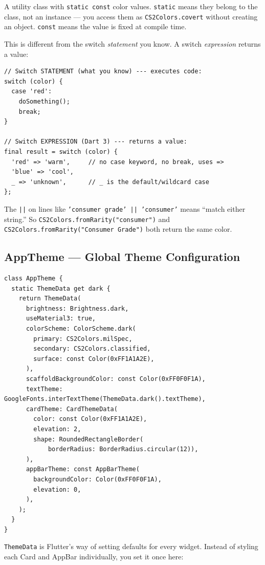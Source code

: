\documentclass[11pt, a4paper]{article}
\begin{document}
A utility class with \texttt{static const} color values. \texttt{static} means they belong to the class, not an instance --- you access them as \texttt{CS2Colors.covert} without creating an object. \texttt{const} means the value is fixed at compile time.

\begin{conceptbox}[title=\textbf{Switch Expression (Dart 3)}]
This is different from the switch \emph{statement} you know. A switch \emph{expression} returns a value:

\begin{lstlisting}[numbers=none]
// Switch STATEMENT (what you know) --- executes code:
switch (color) {
  case 'red':
    doSomething();
    break;
}

// Switch EXPRESSION (Dart 3) --- returns a value:
final result = switch (color) {
  'red' => 'warm',     // no case keyword, no break, uses =>
  'blue' => 'cool',
  _ => 'unknown',      // _ is the default/wildcard case
};
\end{lstlisting}

The \texttt{||} on lines like \texttt{'consumer grade' || 'consumer'} means ``match either string.'' So \texttt{CS2Colors.fromRarity("consumer")} and \texttt{CS2Colors.fromRarity("Consumer Grade")} both return the same color.
\end{conceptbox}

\subsection{AppTheme --- Global Theme Configuration}

\begin{lstlisting}
class AppTheme {
  static ThemeData get dark {
    return ThemeData(
      brightness: Brightness.dark,
      useMaterial3: true,
      colorScheme: ColorScheme.dark(
        primary: CS2Colors.milSpec,
        secondary: CS2Colors.classified,
        surface: const Color(0xFF1A1A2E),
      ),
      scaffoldBackgroundColor: const Color(0xFF0F0F1A),
      textTheme: GoogleFonts.interTextTheme(ThemeData.dark().textTheme),
      cardTheme: CardThemeData(
        color: const Color(0xFF1A1A2E),
        elevation: 2,
        shape: RoundedRectangleBorder(
            borderRadius: BorderRadius.circular(12)),
      ),
      appBarTheme: const AppBarTheme(
        backgroundColor: Color(0xFF0F0F1A),
        elevation: 0,
      ),
    );
  }
}
\end{lstlisting}

\texttt{ThemeData} is Flutter's way of setting defaults for every widget. Instead of styling each Card and AppBar individually, you set it once here:
\end{document}
